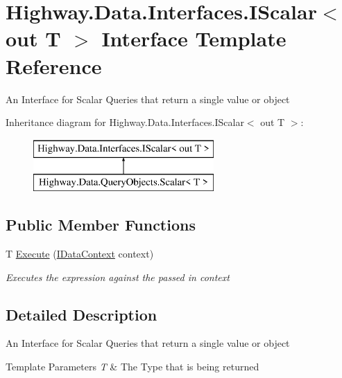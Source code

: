 \hypertarget{interface_highway_1_1_data_1_1_interfaces_1_1_i_scalar-g}{\section{Highway.\-Data.\-Interfaces.\-I\-Scalar$<$ out T $>$ Interface Template Reference}
\label{interface_highway_1_1_data_1_1_interfaces_1_1_i_scalar-g}
}


An Interface for Scalar Queries that return a single value or object  


Inheritance diagram for Highway.\-Data.\-Interfaces.\-I\-Scalar$<$ out T $>$\-:\begin{figure}[H]
\begin{center}
\leavevmode
\includegraphics[height=2.000000cm]{interface_highway_1_1_data_1_1_interfaces_1_1_i_scalar-g}
\end{center}
\end{figure}
\subsection*{Public Member Functions}
\begin{DoxyCompactItemize}
\item 
T \hyperlink{interface_highway_1_1_data_1_1_interfaces_1_1_i_scalar-g_a3a27ca86e587dbd0c1c199ae1cf54174}{Execute} (\hyperlink{interface_highway_1_1_data_1_1_interfaces_1_1_i_data_context}{I\-Data\-Context} context)
\begin{DoxyCompactList}\small\item\em Executes the expression against the passed in context \end{DoxyCompactList}\end{DoxyCompactItemize}


\subsection{Detailed Description}
An Interface for Scalar Queries that return a single value or object 


\begin{DoxyTemplParams}{Template Parameters}
{\em T} & The Type that is being returned\\
\hline
\end{DoxyTemplParams}


